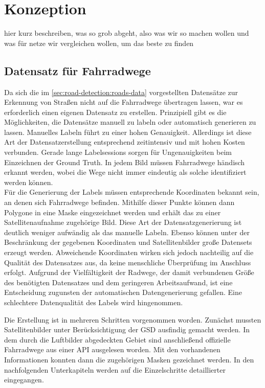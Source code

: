 \chapter{Konzeption} %

hier kurz beschreiben, was so grob abgeht, also was wir so machen wollen und was für netze wir vergleichen wollen,
um das beste zu finden

\section{Datensatz für Fahrradwege} \label{sec:bike-data}

Da sich die im \autoref{sec:road-detection:roads-data} vorgestellten Datensätze zur Erkennung von Straßen nicht auf die Fahrradwege übertragen lassen, war es erforderlich einen eigenen Datensatz zu erstellen.
Prinzipiell gibt es die Möglichkeiten, die Datensätze manuell zu labeln oder automatisch generieren zu lassen.
Manuelles Labeln führt zu einer hohen Genauigkeit.
Allerdings ist diese Art der Datensatzerstellung entsprechend zeitintensiv und mit hohen Kosten verbunden.
Gerade lange Labelsessions sorgen für Ungenauigkeiten beim Einzeichnen der Ground Truth. 
In jedem Bild müssen Fahrradwege händisch erkannt werden, wobei die Wege nicht immer eindeutig als solche identifiziert werden können.\\
Für die Generierung der Labels müssen entsprechende Koordinaten bekannt sein, an denen sich Fahrradwege befinden.
Mithilfe dieser Punkte können dann Polygone in eine Maske eingezeichnet werden und erhält das zu einer Satellitenaufnahme zugehörige Bild.
Diese Art der Datensatzgenerierung ist deutlich weniger aufwändig als das manuelle Labeln. 
Ebenso können unter der Beschränkung der gegebenen Koordinaten und Satellitenbilder große Datensets erzeugt werden.
Abweichende Koordinaten wirken sich jedoch nachteilig auf die Qualität des Datensatzes aus, da keine menschliche Überprüfung im Anschluss erfolgt.
Aufgrund der Vielfältigkeit der Radwege, der damit verbundenen Größe des benötigten Datensatzes und dem geringeren Arbeitsaufwand, ist eine Entscheidung zugunsten der automatischen Datengenerierung gefallen.
Eine schlechtere Datenqualität des Labels wird hingenommen.

Die Erstellung ist in mehreren Schritten vorgenommen worden.
Zunächst mussten Satellitenbilder unter Berücksichtigung der \ac{GSD} ausfindig gemacht werden.
In dem durch die Luftbilder abgedeckten Gebiet sind anschließend offizielle Fahrradwege aus einer API ausgelesen worden.
Mit den vorhandenen Informationen konnten dann die zugehörigen Masken gezeichnet werden.
In den nachfolgenden Unterkapiteln werden auf die Einzelschritte detaillierter eingegangen.

